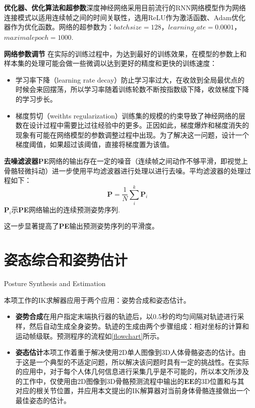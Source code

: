 \textbf{优化器、优化算法和超参数}深度神经网络采用目前流行的RNN网络模型作为网络连接模式以适用连续帧之间的时间关联性，选用ReLU作为激活函数、Adam优化器作为优化函数。网络的超参数为：$batch size=128$，$learning_rate=0.0001$，$maximal epoch = 1000$.

\textbf{网络参数调节}
在实际的训练过程中，为达到最好的训练效果，在模型的参数上和样本集的处理可能会做一些微调以达到更好的精度和更快的训练速度：
\begin{itemize}
\item{学习率下降（learning rate decay）}防止学习率过大，在收敛到全局最优点的时候会来回摆荡，所以学习率随着训练轮数不断按指数级下降，收敛梯度下降的学习步长。

\item{梯度剪切（weithts regularization）}训练集的规模的约束导致了神经网络的层数在设计过程中需要比过往经验中的更多。正因如此，梯度爆炸和梯度消失的现象有可能在网络模型的参数调整过程中出现。为了解决这一问题，设计一个梯度阈值，如果超过该阈值，直接将梯度置为该值。
\end{itemize}

\textbf{去噪滤波器}\textbf{PE}网络的输出存在一定的噪音（连续帧之间动作不够平滑，即视觉上骨骼轻微抖动）进一步使用平均滤波器进行处理以进行去噪。平均滤波器的处理过程如下：
\begin{equation}
\mathbf{P} = \frac{1}{N} \sum_i^k {\mathbf{P}_i}
\end{equation}
$\mathbf{P}_i$示\textbf{PE}网络输出的连续预测姿势序列.

这一步显著提高了\textbf{PE}输出预测姿势序列的平滑度。

\section{姿态综合和姿势估计}{Posture Synthesis and Estimation}

本项工作的IK求解器应用于两个应用：姿势合成和姿态估计。
\begin{itemize}
\item{\textbf{姿势合成}}在用户指定末端执行器的轨迹后，以0.5秒的均匀间隔对轨迹进行采样，然后自动生成全身姿势。轨迹的生成由两个步骤组成：相对坐标的计算和运动帧级联。预测程序的流程如\cref{flowchart}所示。
\item{\textbf{姿态估计}}本项工作着重于解决使用2D单人图像到3D人体骨骼姿态的估计。由于这是一个典型的不适定问题，所以解决该问题时具有一定的挑战性。在实际的应用中，对于每个人体几何信息进行采集几乎是不可能的，所以本文所涉及的工作中，仅使用由2D图像到3D骨骼预测流程中输出的$\mathbf{EE}$的3D位置和与其对应的根关节位置，并应用本文提出的IK解算器对当前身体骨骼连接做出一个最佳姿态的估计。
\end{itemize}












